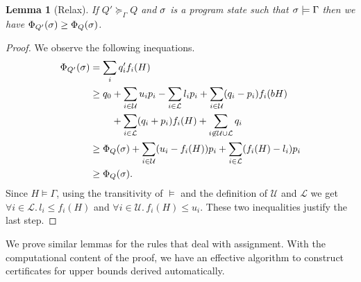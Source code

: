 \documentclass[nocopyrightspace,preprint]{sigplanconf}
\newtheorem{lemma}{Lemma}
\begin{document}
\begin{lemma}[Relax]
  If $Q' \succeq_\Gamma Q$ and $\sigma$ is a program state such that
  $\sigma \models \Gamma$ then we have $\Phi_{Q'}(\sigma) \ge \Phi_Q(\sigma)$.
\end{lemma}
\begin{proof}
We observe the following inequations.
\begin{align*}
\Phi_{Q'}(\sigma) &= \sum_i q'_i f_i(H) \\
&\ge q_0 + \sum_{i\in\mathcal U} u_i p_i - \sum_{i\in\mathcal L} l_i p_i
  + \sum_{i\in\mathcal U} (q_i - p_i) f_i(bH)  \\ & \;\;\;\;\;\;\;\; + \sum_{i\in\mathcal L} (q_i + p_i) f_i(H)
  + \sum_{i\not\in \mathcal U \cup \mathcal L} q_i \\
 &\ge \Phi_Q(\sigma)
  + \sum_{i\in\mathcal U} (u_i - f_i(H)) p_i
  + \sum_{i\in\mathcal L} (f_i(H) - l_i) p_i \\
 &\ge \Phi_Q(\sigma).
\end{align*}
Since $H \models \Gamma$, using the transitivity of $\models$ and
the definition of $\mathcal U$ and $\mathcal L$ we get
$\forall i\in\mathcal L.\, l_i \le f_i(H)$ and
$\forall i\in\mathcal U.\, f_i(H)\le u_i$.
These two inequalities justify the last step.
\end{proof}
%
\noindent
We prove similar lemmas for the rules that deal with assignment.  With
the computational content of the proof, we have an effective algorithm
to construct certificates for upper bounds derived automatically.
\end{document}
